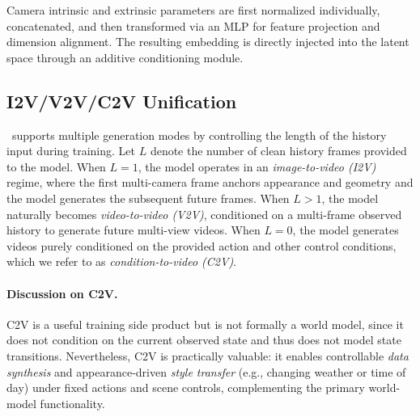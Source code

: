 Camera intrinsic and extrinsic parameters are first normalized individually, concatenated, and then transformed via an MLP for feature projection and dimension alignment. 
The resulting embedding is directly injected into the latent space through an additive conditioning module.

\subsection{I2V/V2V/C2V Unification}
\modelname~supports multiple generation modes by controlling the length of the history input during training. Let $L$ denote the number of clean history frames provided to the model. When $L{=}1$, the model operates in an \emph{image-to-video (I2V)} regime, where the first multi-camera frame anchors appearance and geometry and the model generates the subsequent future frames. When $L{>}1$, the model naturally becomes \emph{video-to-video (V2V)}, conditioned on a multi-frame observed history to generate future multi-view videos. When $L{=}0$, the model generates videos purely conditioned on the provided action and other control conditions, which we refer to as \emph{condition-to-video (C2V)}.

\paragraph{Discussion on C2V.}
C2V is a useful training side product but is not formally a world model, since it does not condition on the current observed state and thus does not model state transitions. Nevertheless, C2V is practically valuable: it enables controllable \emph{data synthesis} and appearance-driven \emph{style transfer} (e.g., changing weather or time of day) under fixed actions and scene controls, complementing the primary world-model functionality.

\smallskip


